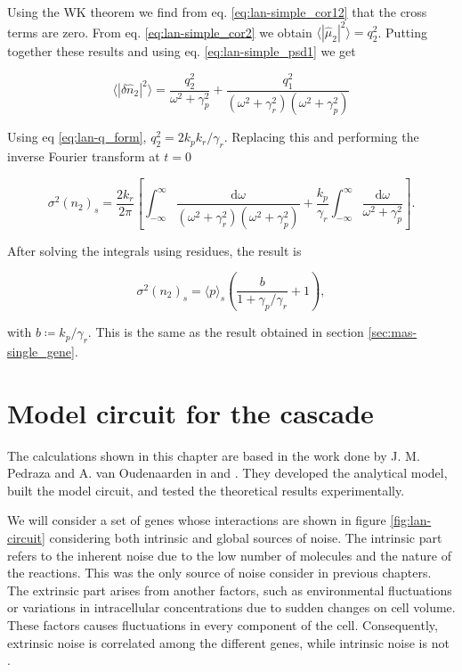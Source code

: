 Using the WK theorem we find from eq. \eqref{eq:lan-simple_cor12} that the cross terms are zero. From eq. \eqref{eq:lan-simple_cor2} we obtain $\langle|\hat{\mu}_2|^2\rangle = q_2^2$. Putting together these results and using eq. \eqref{eq:lan-simple_psd1} we get

\begin{equation*}
  \langle|\delta\hat{n}_2|^2\rangle = \frac{q_2^2}{\omega^2+\gamma_p^2}+\frac{q_1^2}{(\omega^2+\gamma_r^2)(\omega^2+\gamma_p^2)}
\end{equation*}

Using eq \eqref{eq:lan-q_form}, $q_2^2 = 2k_pk_r/\gamma_r$. Replacing this and performing the inverse Fourier transform at $t=0$

\begin{equation*}
  \sigma^2(n_2)_s = \frac{2k_r}{2\pi}\left[\int_{-\infty}^\infty\frac{\mathrm{d}\omega}{(\omega^2+\gamma_r^2)(\omega^2+\gamma_p^2)} + \frac{k_p}{\gamma_r}\int_{-\infty}^\infty \frac{\mathrm{d}\omega}{\omega^2+\gamma_p^2} \right].
\end{equation*}

After solving the integrals using residues, the result is

\begin{equation}
  \label{eq:lan-simple_varp}
  \sigma^2(n_2)_s = \langle p\rangle_s\left(\frac{b}{1+\gamma_p/\gamma_r}+1\right),
\end{equation}

with $b\coloneqq k_p/\gamma_r$. This is the same as the result obtained in section \ref{sec:mas-single_gene}.

\section{Model circuit for the cascade}

The calculations shown in this chapter are based in the work done by J. M. Pedraza and A. van Oudenaarden in \cite{pedraza05} and \cite{pedraza06}. They developed the analytical model, built the model circuit, and tested the theoretical results experimentally.

We will consider a set of genes whose interactions are shown in figure \ref{fig:lan-circuit} considering both intrinsic and global sources of noise. The intrinsic part refers to the inherent noise due to the low number of molecules and the nature of the reactions. This was the only source of noise consider in previous chapters. The extrinsic part arises from another factors, such as environmental fluctuations or variations in intracellular concentrations due to sudden changes on cell volume. These factors causes fluctuations in every component of the cell. Consequently, extrinsic noise is correlated among the different genes, while intrinsic noise is not \cite{elowitz02}.

